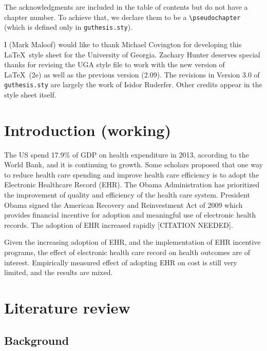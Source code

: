 \documentclass[12pt]{report}
\begin{document}
The acknowledgments are included in the table of contents but do
not have a chapter number.  To achieve that, we
declare them to be a \verb"\pseudochapter" (which is defined only in
\verb"guthesis.sty").

I (Mark Maloof) would like to thank Michael Covington for developing
this \LaTeX\ style sheet for the University of Georgia.
Zachary Hunter deserves special thanks for revising the UGA style
file to work with the new version of \LaTeX\ (2e) as well as the
previous version (2.09).
The revisions in
Version 3.0 of \verb"guthesis.sty" are
largely the work of Isidor Ruderfer.
Other credits appear in the style sheet itself.


\tableofcontents

\listoffigures  %
\listoftables   %

\newpage

\chapter{Introduction (working)}
The US spend 17.9\% of GDP on health expenditure in 2013, according to the World Bank, and it is continuing to growth. Some scholars proposed that one way to reduce health care spending and improve health care efficiency is to adopt the Electronic Healthcare Record (EHR). The Obama Administration has prioritized the improvement of quality and efficiency of the health care system. President Obama signed the American Recovery and Reinvestment Act of 2009 which provides financial incentive for adoption and meaningful use of electronic health records. The adoption of EHR increased rapidly [CITATION NEEDED].

Given the increasing adoption of EHR, and the implementation of EHR incentive programs, the effect of electronic health care record on health outcomes are of interest. Empirically measured effect of adopting EHR on cost is still very limited, and the results are mixed.

\chapter{Literature review}

\section{Background}
\end{document}
